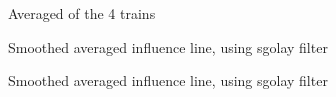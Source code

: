 \begin{figure}[H]
\centering

\caption{Averaged of the 4 trains}
\label{fig:infl_averaged}
\end{figure}

\begin{figure}[H]
\centering

\caption{Smoothed averaged influence line, using sgolay filter}
\label{fig:infl_averaged}
\end{figure}

\begin{figure}[H]
\centering

\caption{Smoothed averaged influence line, using sgolay filter}
\label{fig:infl_averaged}
\end{figure}
